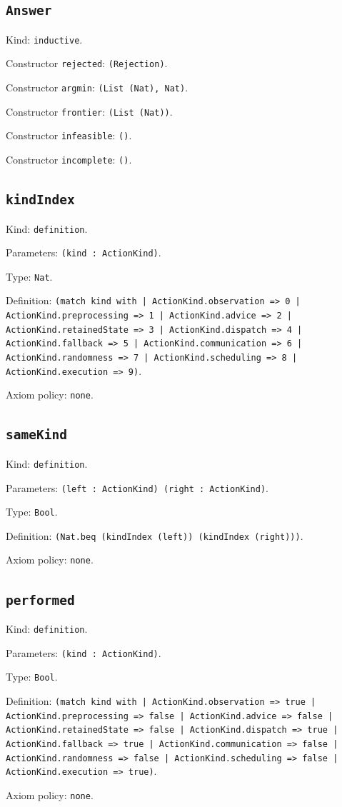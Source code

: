 \documentclass[11pt]{article}
\begin{document}
\subsection*{\texttt{Answer}}
\noindent Kind: \texttt{inductive}.\par
\noindent Constructor \texttt{rejected}: \texttt{(Rejection)}.\par
\noindent Constructor \texttt{argmin}: \texttt{(List (Nat), Nat)}.\par
\noindent Constructor \texttt{frontier}: \texttt{(List (Nat))}.\par
\noindent Constructor \texttt{infeasible}: \texttt{()}.\par
\noindent Constructor \texttt{incomplete}: \texttt{()}.\par
\subsection*{\texttt{kindIndex}}
\noindent Kind: \texttt{definition}.\par
\noindent Parameters: \texttt{(kind : ActionKind)}.\par
\noindent Type: \texttt{Nat}.\par
\noindent Definition: \texttt{(match kind with | ActionKind.observation => 0 | ActionKind.preprocessing => 1 | ActionKind.advice => 2 | ActionKind.retainedState => 3 | ActionKind.dispatch => 4 | ActionKind.fallback => 5 | ActionKind.communication => 6 | ActionKind.randomness => 7 | ActionKind.scheduling => 8 | ActionKind.execution => 9)}.\par
\noindent Axiom policy: \texttt{none}.\par
\subsection*{\texttt{sameKind}}
\noindent Kind: \texttt{definition}.\par
\noindent Parameters: \texttt{(left : ActionKind) (right : ActionKind)}.\par
\noindent Type: \texttt{Bool}.\par
\noindent Definition: \texttt{(Nat.beq (kindIndex (left)) (kindIndex (right)))}.\par
\noindent Axiom policy: \texttt{none}.\par
\subsection*{\texttt{performed}}
\noindent Kind: \texttt{definition}.\par
\noindent Parameters: \texttt{(kind : ActionKind)}.\par
\noindent Type: \texttt{Bool}.\par
\noindent Definition: \texttt{(match kind with | ActionKind.observation => true | ActionKind.preprocessing => false | ActionKind.advice => false | ActionKind.retainedState => false | ActionKind.dispatch => true | ActionKind.fallback => true | ActionKind.communication => false | ActionKind.randomness => false | ActionKind.scheduling => false | ActionKind.execution => true)}.\par
\noindent Axiom policy: \texttt{none}.\par
\end{document}
